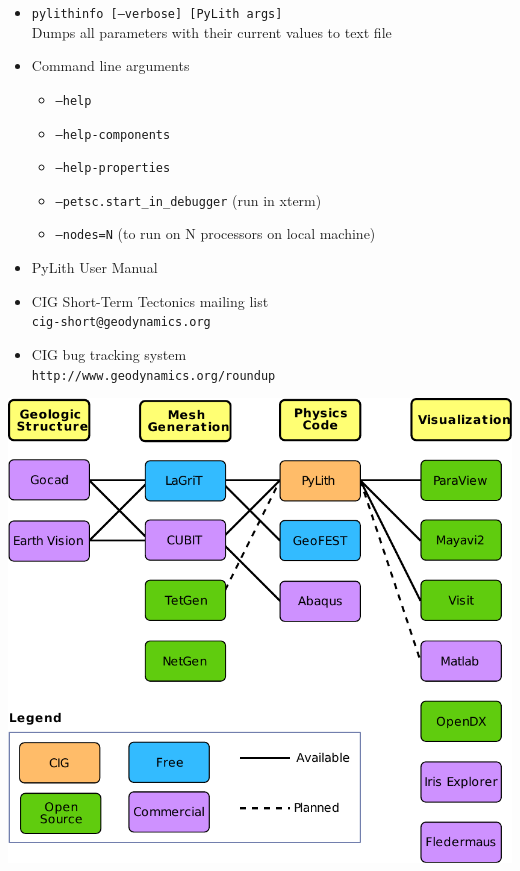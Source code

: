 \documentclass[pdftex,cig,slideColor]{pp4slides}
\begin{document}
  \summary{}

  \begin{itemize}
  \item {\tt pylithinfo [--verbose] [PyLith args]}\\
    Dumps all parameters with their current values to text file
  \item Command line arguments
    \begin{itemize}
    \item {\tt --help}
    \item {\tt --help-components}
    \item {\tt --help-properties}
    \item {\tt --petsc.start\_in\_debugger} (run in xterm)
    \item {\tt --nodes=N} (to run on N processors on local machine)
    \end{itemize}
  \item PyLith User Manual
  \item CIG Short-Term Tectonics mailing list\\
    {\tt cig-short@geodynamics.org}
  \item CIG bug tracking system\\
    {\tt http://www.geodynamics.org/roundup}
  \end{itemize}


  \vfill
  \begin{center}
    \includegraphics[scale=1.15]{figs/workflow}
  \end{center}
  \vfill


\end{document}
